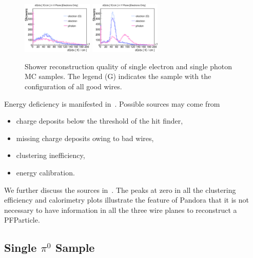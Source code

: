 \begin{figure}[htbp]
\begin{center}
\includegraphics[width=0.3\textwidth]{figs/mc/single_em/dQdxV.eps}
\includegraphics[width=0.3\textwidth]{figs/mc/single_em/dQdxY.eps}
\caption{Shower reconstruction quality of single electron and single
photon MC samples.  The legend (G) indicates the sample with the configuration
of all good wires.}
\label{fig:shr_quality_single_em}
\end{center}
\end{figure}


Energy deficiency is manifested in~.
Possible sources may come from
\begin{itemize}
\item charge deposits below the threshold of the hit finder,
\item missing charge deposits owing to bad wires,
\item clustering inefficiency,
\item energy calibration.
\end{itemize}
We further discuss the sources in~. 
The peaks at zero in all the clustering efficiency and calorimetry
plots illustrate the feature of Pandora that it is not necessary to
have information in all the three wire planes to reconstruct a 
PFParticle.\\


\subsection{Single $\pi^0$ Sample}
\label{sec:single_pi0}

